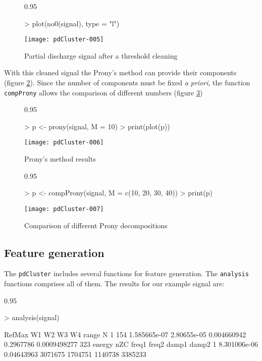 \documentclass{article}
\renewenvironment{Schunk}{\begin{center}
    \scriptsize
    \begin{boxedminipage}{0.95\textwidth}}{
    \end{boxedminipage}\end{center}}
\begin{document}
\begin{figure}
  \centering
\begin{Schunk}
\begin{Sinput}
> plot(no0(signal), type = "l")
\end{Sinput}
\end{Schunk}
\texttt{[image: pdCluster-005]}
  \caption{Partial discharge signal after a threshold cleaning}
  \label{fig:no0}
\end{figure}

With this cleaned signal the Prony's method can provide their
components (figure \ref{fig:prony}). Since the number of components
must be fixed \emph{a priori}, the function \texttt{compProny} allows
the comparison of different numbers (figure \ref{fig:pronyComp})

\begin{figure}
  \centering
\begin{Schunk}
\begin{Sinput}
> p <- prony(signal, M = 10)
> print(plot(p))
\end{Sinput}
\end{Schunk}
\texttt{[image: pdCluster-006]}
  \caption{Prony's method results}
  \label{fig:prony}
\end{figure}

\begin{figure}
  \centering
\begin{Schunk}
\begin{Sinput}
> p <- compProny(signal, M = c(10, 20, 30, 40))
> print(p)
\end{Sinput}
\end{Schunk}
\texttt{[image: pdCluster-007]}
  \caption{Comparison of different Prony decompositions}
  \label{fig:pronyComp}
\end{figure}
 
\subsection{Feature generation}
\label{sec:features}

The \texttt{pdCluster} includes several functions for feature
generation. The \texttt{analysis} functions comprises all of them. The
results for our example signal are:
\begin{Schunk}
\begin{Sinput}
> analysis(signal)
\end{Sinput}
\begin{Soutput}
  RefMax           W1          W2          W3        W4        range   N
1    154 1.585665e-07 2.80655e-05 0.004660942 0.2967786 0.0009498277 323
        energy        nZC   freq1   freq2   damp1   damp2
1 8.301006e-06 0.04643963 3071675 1704751 1140738 3385233
\end{Soutput}
\end{Schunk}
\end{document}

